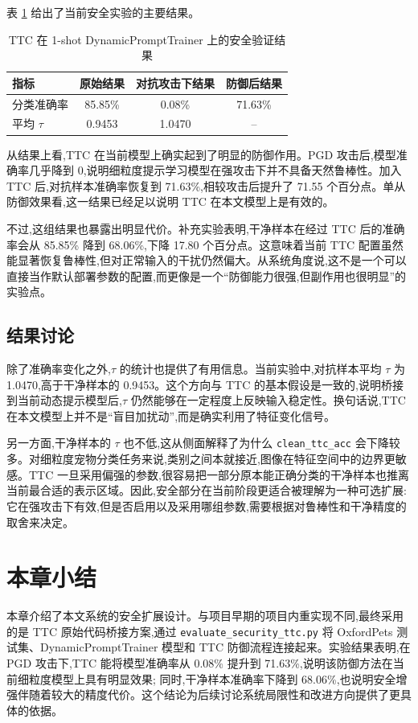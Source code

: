 表 \ref{tab:ttc_result} 给出了当前安全实验的主要结果。

\begin{table}[H]
\centering
\caption{TTC 在 1-shot DynamicPromptTrainer 上的安全验证结果}
\label{tab:ttc_result}
\begin{tabular}{l c c c}
\toprule
指标 & 原始结果 & 对抗攻击下结果 & 防御后结果 \\
\midrule
分类准确率 & 85.85\% & 0.08\% & 71.63\% \\
平均 \(\tau\) & 0.9453 & 1.0470 & -- \\
\bottomrule
\end{tabular}
\end{table}

从结果上看,TTC 在当前模型上确实起到了明显的防御作用。PGD 攻击后,模型准确率几乎降到 0,说明细粒度提示学习模型在强攻击下并不具备天然鲁棒性。加入 TTC 后,对抗样本准确率恢复到 71.63\%,相较攻击后提升了 71.55 个百分点。单从防御效果看,这一结果已经足以说明 TTC 在本文模型上是有效的。

不过,这组结果也暴露出明显代价。补充实验表明,干净样本在经过 TTC 后的准确率会从 85.85\% 降到 68.06\%,下降 17.80 个百分点。这意味着当前 TTC 配置虽然能显著恢复鲁棒性,但对正常输入的干扰仍然偏大。从系统角度说,这不是一个可以直接当作默认部署参数的配置,而更像是一个“防御能力很强,但副作用也很明显”的实验点。

\subsection{结果讨论}

除了准确率变化之外,\(\tau\) 的统计也提供了有用信息。当前实验中,对抗样本平均 \(\tau\) 为 1.0470,高于干净样本的 0.9453。这个方向与 TTC 的基本假设是一致的,说明桥接到当前动态提示模型后,\(\tau\) 仍然能够在一定程度上反映输入稳定性。换句话说,TTC 在本文模型上并不是“盲目加扰动”,而是确实利用了特征变化信号。

另一方面,干净样本的 \(\tau\) 也不低,这从侧面解释了为什么 \texttt{clean\_ttc\_acc} 会下降较多。对细粒度宠物分类任务来说,类别之间本就接近,图像在特征空间中的边界更敏感。TTC 一旦采用偏强的参数,很容易把一部分原本能正确分类的干净样本也推离当前最合适的表示区域。因此,安全部分在当前阶段更适合被理解为一种可选扩展: 它在强攻击下有效,但是否启用以及采用哪组参数,需要根据对鲁棒性和干净精度的取舍来决定。

\section{本章小结}

本章介绍了本文系统的安全扩展设计。与项目早期的项目内重实现不同,最终采用的是 TTC 原始代码桥接方案,通过 \texttt{evaluate\_security\_ttc.py} 将 OxfordPets 测试集、DynamicPromptTrainer 模型和 TTC 防御流程连接起来。实验结果表明,在 PGD 攻击下,TTC 能将模型准确率从 0.08\% 提升到 71.63\%,说明该防御方法在当前细粒度模型上具有明显效果; 同时,干净样本准确率下降到 68.06\%,也说明安全增强伴随着较大的精度代价。这个结论为后续讨论系统局限性和改进方向提供了更具体的依据。
